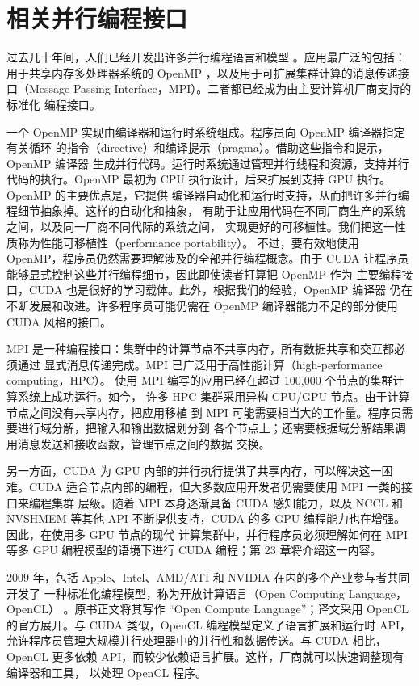 \section{相关并行编程接口}
\label{sec:related-parallel-interfaces}

过去几十年间，人们已经开发出许多并行编程语言和模型
\cite{mattson2004}。应用最广泛的包括：用于共享内存多处理器系统的 OpenMP
\cite{openmp2025}，以及用于可扩展集群计算的消息传递接口（Message Passing
Interface，MPI）\cite{mpi1994}。二者都已经成为由主要计算机厂商支持的标准化
编程接口。

一个 OpenMP 实现由编译器和运行时系统组成。程序员向 OpenMP 编译器指定有关循环
的指令（directive）和编译提示（pragma）。借助这些指令和提示，OpenMP 编译器
生成并行代码。运行时系统通过管理并行线程和资源，支持并行代码的执行。OpenMP
最初为 CPU 执行设计，后来扩展到支持 GPU 执行。OpenMP 的主要优点是，它提供
编译器自动化和运行时支持，从而把许多并行编程细节抽象掉。这样的自动化和抽象，
有助于让应用代码在不同厂商生产的系统之间，以及同一厂商不同代际的系统之间，
实现更好的可移植性。我们把这一性质称为性能可移植性（performance portability）。
不过，要有效地使用 OpenMP，程序员仍然需要理解涉及的全部并行编程概念。由于
CUDA 让程序员能够显式控制这些并行编程细节，因此即使读者打算把 OpenMP 作为
主要编程接口，CUDA 也是很好的学习载体。此外，根据我们的经验，OpenMP 编译器
仍在不断发展和改进。许多程序员可能仍需在 OpenMP 编译器能力不足的部分使用
CUDA 风格的接口。

MPI 是一种编程接口：集群中的计算节点不共享内存，所有数据共享和交互都必须通过
显式消息传递完成。MPI 已广泛用于高性能计算（high-performance computing，HPC）。
使用 MPI 编写的应用已经在超过 100,000 个节点的集群计算系统上成功运行。如今，
许多 HPC 集群采用异构 CPU/GPU 节点。由于计算节点之间没有共享内存，把应用移植
到 MPI 可能需要相当大的工作量。程序员需要进行域分解，把输入和输出数据划分到
各个节点上；还需要根据域分解结果调用消息发送和接收函数，管理节点之间的数据
交换。

另一方面，CUDA 为 GPU 内部的并行执行提供了共享内存，可以解决这一困难。CUDA
适合节点内部的编程，但大多数应用开发者仍需要使用 MPI 一类的接口来编程集群
层级。随着 MPI 本身逐渐具备 CUDA 感知能力，以及 NCCL 和 NVSHMEM 等其他 API
不断提供支持，CUDA 的多 GPU 编程能力也在增强。因此，在使用多 GPU 节点的现代
计算集群中，并行程序员必须理解如何在 MPI 等多 GPU 编程模型的语境下进行 CUDA
编程；第 23 章将介绍这一内容。

2009 年，包括 Apple、Intel、AMD/ATI 和 NVIDIA 在内的多个产业参与者共同开发了
一种标准化编程模型，称为开放计算语言（Open Computing Language，OpenCL）
\cite{opencl2008}。原书正文将其写作 ``Open Compute Language''；译文采用 OpenCL
的官方展开。与 CUDA 类似，OpenCL 编程模型定义了语言扩展和运行时 API，
允许程序员管理大规模并行处理器中的并行性和数据传送。与 CUDA 相比，OpenCL
更多依赖 API，而较少依赖语言扩展。这样，厂商就可以快速调整现有编译器和工具，
以处理 OpenCL 程序。

